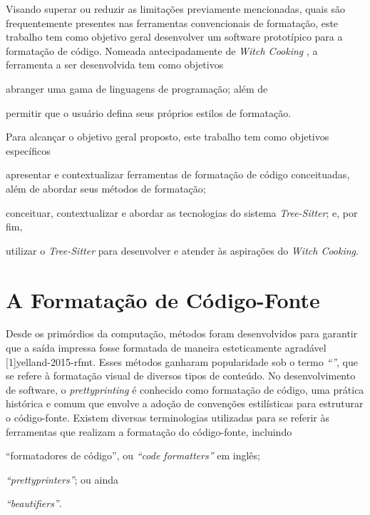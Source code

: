 \documentclass
  [11pt,a4paper,english,brazil,openright,sumario=tradicional,twoside]
  {abntex2}
\newcommand{\treesitter}{\textit{Tree-Sitter}\xspace}
\newcommand{\witchcooking}{\textit{Witch Cooking}\xspace}
\begin{document}
  Visando superar ou reduzir as limitações previamente mencionadas, quais são
  frequentemente presentes nas ferramentas convencionais de formatação, este
  trabalho tem como objetivo geral desenvolver um software prototípico para a
  formatação de código. Nomeada antecipadamente de \witchcooking
  \cite{silva-2023-witch}, a ferramenta a ser desenvolvida tem como
  objetivos
  \begin{inparaenum}
    \item abranger uma gama de linguagens de programação; além de
    \item permitir que o usuário defina seus próprios estilos de formatação.
  \end{inparaenum}

  Para alcançar o objetivo geral proposto, este trabalho tem como objetivos
  específicos
  \begin{inparaenum}
    \item apresentar e contextualizar ferramentas de formatação de código
          conceituadas, além de abordar seus métodos de formatação;
    \item conceituar, contextualizar e abordar as tecnologias do sistema
          \treesitter; e, por fim,
    \item utilizar o \treesitter para desenvolver e atender às aspirações do
          \witchcooking.
  \end{inparaenum}


  \chapter{A Formatação de Código-Fonte}

  Desde os primórdios da computação, métodos foram desenvolvidos para garantir
  que a saída impressa fosse formatada de maneira esteticamente agradável
  [1]{yelland-2015-rfmt}. Esses métodos ganharam
  popularidade sob o termo \textit{``''}, que se refere à
  formatação visual de diversos tipos de conteúdo. No desenvolvimento de
  software, o \textit{prettyprinting} é conhecido como formatação de código,
  uma prática histórica e comum que envolve a adoção de convenções estilísticas
  para estruturar o código-fonte. Existem diversas terminologias utilizadas
  para se referir às ferramentas que realizam a formatação do código-fonte,
  incluindo
  \begin{inparaenum}
    \item ``formatadores de código'', ou \textit{``code formatters''} em
          inglês;
    \item \textit{``prettyprinters''}; ou ainda
    \item \textit{``beautifiers''}.
  \end{inparaenum}
\end{document}
